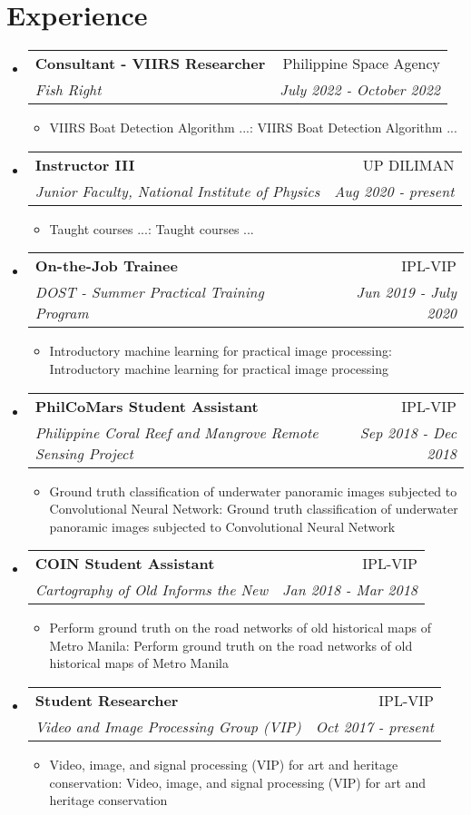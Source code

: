 \documentclass[a4paper,10pt]{article}
\makeatletter
\def \ifempty#1{\def\temp{#1} \ifx\temp\empty }
\newcommand{\resumeItem}[2]{
  \item\small{
  	\ifempty{#1}#2\else\textbf{#1}{: #2 \vspace{-2pt}}\fi
  }
}
\newcommand{\resumeSubheading}[4]{
  \vspace{-1pt}\item
    \begin{tabular*}{0.97\textwidth}{l@{\extracolsep{\fill}}r}
      \textbf{#1} & #2 \\
      \textit{\small#3} & \textit{\small #4} \\
    \end{tabular*}\vspace{-5pt}
}
\newcommand{\resumeSubHeadingListStart}{\begin{itemize}[leftmargin=*]}
\newcommand{\resumeSubHeadingListEnd}{\end{itemize}}
\newcommand{\resumeItemListStart}{\begin{itemize}}
\newcommand{\resumeItemListEnd}{\end{itemize}\vspace{-5pt}}
\makeatother
\begin{document}
\section{Experience}
  \resumeSubHeadingListStart
    \resumeSubheading
      {Consultant - VIIRS Researcher}{Philippine Space Agency}{Fish Right}{July 2022 - October 2022}
    \resumeItemListStart
      \resumeItem{}
          {VIIRS Boat Detection Algorithm ...}
      \resumeItemListEnd
    \resumeSubheading
      {Instructor III}{UP DILIMAN}{Junior Faculty, National Institute of Physics}{Aug 2020 - present}
    \resumeItemListStart
      	\resumeItem{}
          {Taught courses ...}
      \resumeItemListEnd
    \resumeSubheading    
      {On-the-Job Trainee}{IPL-VIP}
      {DOST - Summer Practical Training Program}{Jun 2019 - July 2020}
      \resumeItemListStart
      	\resumeItem{}
          {Introductory machine learning for practical image processing}
      \resumeItemListEnd
        \resumeSubheading
      {PhilCoMars Student Assistant}{IPL-VIP}
      {Philippine Coral Reef and Mangrove Remote Sensing Project}{Sep 2018 - Dec 2018}
      \resumeItemListStart
      	\resumeItem{}
          {Ground truth classification of underwater panoramic images subjected to Convolutional Neural Network}
      \resumeItemListEnd
      \resumeSubheading
      {COIN Student Assistant}{IPL-VIP}
      {Cartography of Old Informs the New}{Jan 2018 - Mar 2018}
      \resumeItemListStart
      	\resumeItem{}
          {Perform ground truth on the road networks of old historical maps of Metro Manila}
      \resumeItemListEnd
        \resumeSubheading
      {Student Researcher}{IPL-VIP}
      {Video and Image Processing Group (VIP)}{Oct 2017 - present}
      \resumeItemListStart
      	\resumeItem{}
          {Video, image, and signal processing (VIP) for art and heritage conservation}
      \resumeItemListEnd
  \resumeSubHeadingListEnd


\end{document}

